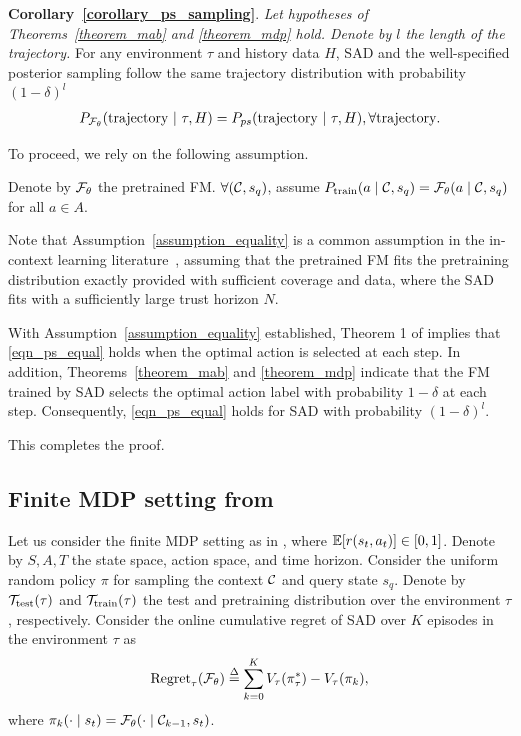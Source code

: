 \textbf{Corollary~\ref{corollary_ps_sampling}}.
\textit{
Let hypotheses of Theorems~\ref{theorem_mab}  and \ref{theorem_mdp} hold. Denote by $l$ the length of the trajectory.}
For any environment $\tau$ and history data $H$, SAD and the well-specified posterior sampling follow the same trajectory distribution with probability $(1-\delta)^l$
\begin{align}\label{eqn_ps_equal}
    P_{{\mathcal F}_{\theta}} (\text{trajectory} \ | \ \tau, H) = P_{ps}(\text{trajectory}  \ | \  \tau, H), \forall \text{trajectory}.
\end{align}
%
%
\begin{myproof}
%
To proceed, we rely on the following assumption.
%
\begin{assumption}
\label{assumption_equality}
Denote by ${\mathcal F}_{\theta}$ the pretrained FM. $\forall ({\mathcal C}, s_q)$,
assume $P_{\text{train}}(a \mid {\ensuremath{\mathcal C}}, s_q) = {\mathcal F}_{\theta}( a \mid {\ensuremath{\mathcal C}}, s_q)$ for all $a \in A$.
\end{assumption}
%
Note that Assumption~\ref{assumption_equality} is a common assumption in the in-context learning literature~\citep{xie2021explanation, lee2024supervised}, assuming that the pretrained FM fits the pretraining distribution exactly provided with sufficient coverage and data, where the SAD fits with a sufficiently large trust horizon $N$. 

With Assumption~\ref{assumption_equality} established, Theorem 1 of \citep{lee2024supervised} implies that \eqref{eqn_ps_equal} holds when the optimal action is selected at each step.
%
In addition, Theorems~\ref{theorem_mab} and \ref{theorem_mdp} indicate that the FM trained by SAD selects the optimal action label with probability $1-\delta$ at each step. Consequently, \eqref{eqn_ps_equal} holds for SAD with probability $(1-\delta)^l$. 

This completes the proof.
\end{myproof}






\subsection{Finite MDP setting from \cite{osband2013more}}
\label{appendix_finite_mdp_setting}


Let us consider the finite MDP setting as in \citep{osband2013more}, where ${\mathbb E}[r(s_t, a_t)] \in [0, 1]$. Denote by $S, A, T$ the state space, action space, and time horizon. Consider the uniform random policy $\pi$ for sampling the context ${\mathcal C}$ and query state $s_q$.
%
Denote by ${{\mathcal T}_{\text{test}}(\tau)} $ and ${{\mathcal T}_{\text{train}}(\tau)}$ the test and pretraining distribution over the environment $\tau$, respectively.
%
Consider the online cumulative regret of SAD over $K$ episodes in the environment $\tau$ as
\begin{align}
    \text{Regret}_\tau({\mathcal F}_{\theta}) \overset{\Delta}{=} \sum_{k=0}^K V_\tau (\pi_\tau^*) - V_\tau(\pi_k),
\end{align}
where $\pi_k (\cdot \mid s_t) = {\mathcal F}_{\theta}(\cdot \mid {\ensuremath{\mathcal C}}_{k-1}, s_t)$.




